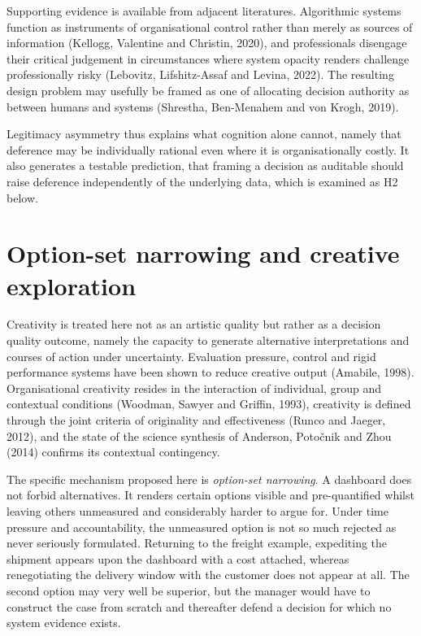 \documentclass[12pt,a4paper]{article}
\begin{document}
Supporting evidence is available from adjacent literatures. Algorithmic systems function as instruments of
organisational control rather than merely as sources of information (Kellogg, Valentine and Christin,
2020), and professionals disengage their critical judgement in circumstances where system opacity renders
challenge professionally risky (Lebovitz, Lifshitz-Assaf and Levina, 2022). The resulting design problem
may usefully be framed as one of allocating decision authority as between humans and systems (Shrestha,
Ben-Menahem and von Krogh, 2019).

Legitimacy asymmetry thus explains what cognition alone cannot, namely that deference may be individually
rational even where it is organisationally costly. It also generates a testable prediction, that framing a
decision as auditable should raise deference independently of the underlying data, which is examined as H2
below.

\section{Option-set narrowing and creative exploration}

Creativity is treated here not as an artistic quality but rather as a decision quality outcome,
namely the capacity to generate alternative interpretations and courses of action under
uncertainty. Evaluation pressure, control and rigid performance systems have been shown to reduce
creative output (Amabile, 1998). Organisational creativity resides in the interaction of
individual, group and contextual conditions (Woodman, Sawyer and Griffin, 1993), creativity is
defined through the joint criteria of originality and effectiveness (Runco and Jaeger, 2012), and
the state of the science synthesis of Anderson, Potočnik and Zhou (2014) confirms its contextual
contingency.

The specific mechanism proposed here is \emph{option-set narrowing}. A dashboard does not forbid
alternatives. It renders certain options visible and pre-quantified whilst leaving others
unmeasured and considerably harder to argue for. Under time pressure and accountability, the
unmeasured option is not so much rejected as never seriously formulated. Returning to the freight
example, expediting the shipment appears upon the dashboard with a cost attached, whereas
renegotiating the delivery window with the customer does not appear at all. The second option may
very well be superior, but the manager would have to construct the case from scratch and
thereafter defend a decision for which no system evidence exists.
\end{document}
